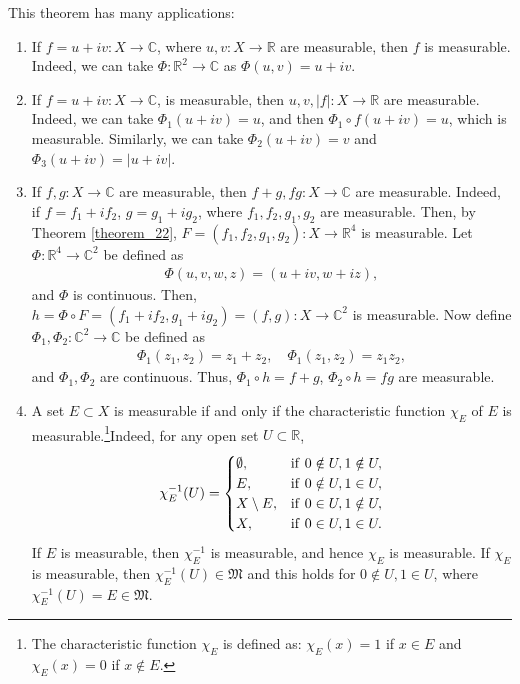 \documentclass[11pt]{book}
\theoremstyle{definition}
\numberwithin{equation}{chapter}
\begin{document}
\medskip

This theorem has many applications:
\begin{enumerate}[label=(\alph*)]
    \item If $f = u + iv: X \to \mathbb{C}$, where $u,v:X\to\mathbb{R}$ are measurable, then $f$ is measurable. Indeed, we can take $\Phi:\mathbb{R}^2 \to \mathbb{C}$ as $\Phi(u,v) = u + iv$.
    
    \item If $f = u + iv: X \to \mathbb{C}$, is measurable, then $u,v,\left|f\right|: X \to \mathbb{R}$ are measurable. Indeed, we can take $\Phi_1(u+iv) = u$, and then $\Phi_1\circ f(u+iv) = u$, which is measurable. Similarly, we can take $\Phi_2(u+iv) = v$ and $\Phi_3(u+iv) = \left|u+iv\right|$.
    
    \item If $f,g: X \to \mathbb{C}$ are measurable, then $f+g,fg: X \to \mathbb{C}$ are measurable. Indeed, if $f = f_1 + if_2$, $g = g_1 + ig_2$, where $f_1,f_2,g_1,g_2$ are measurable. Then, by Theorem \ref{theorem_22}, $F = (f_1,f_2,g_1,g_2): X \to \mathbb{R}^4$ is measurable. Let $\Phi:\mathbb{R}^4 \to \mathbb{C}^2$ be defined as
    \begin{align*}
        \Phi(u,v,w,z) = (u+iv,w+iz),
    \end{align*}
    and $\Phi$ is continuous. Then, $h = \Phi\circ F = (f_1+if_2,g_1+ig_2) = (f,g): X \to \mathbb{C}^2$ is measurable. Now define $\Phi_1, \Phi_2: \mathbb{C}^2 \to \mathbb{C}$ be defined as
    \begin{align*}
        \Phi_1(z_1,z_2) = z_1 + z_2, \quad \Phi_1(z_1,z_2) = z_1 z_2,
    \end{align*}
    and $\Phi_1, \Phi_2$ are continuous. Thus, $\Phi_1\circ h = f+g$, $\Phi_2 \circ h = fg$ are measurable.
    
    \item A set $E \subset X$ is measurable if and only if the characteristic function $\chi_E$ of $E$ is measurable.\footnote{The characteristic function $\chi_E$ is defined as: $\chi_E(x) = 1$ if $x \in E$ and $\chi_E(x) = 0$ if $x \notin E$.}Indeed, for any open set $U \subset \mathbb{R}$,
    \begin{align*}
        \chi_E^{-1}(U) = \begin{cases}
            \emptyset, & {\rm if}\,\, 0 \notin U, 1 \notin U, \\
            E, & {\rm if}\,\, 0 \notin U, 1 \in U, \\
            X \setminus E, & {\rm if}\,\, 0 \in U, 1 \notin U,\\
            X, & {\rm if}\,\, 0 \in U, 1 \in U.
        \end{cases}
    \end{align*}
    If $E$ is measurable, then $\chi_E^{-1}$ is measurable, and hence $\chi_E$ is measurable. If $\chi_E$ is measurable, then $\chi_E^{-1}(U) \in \mathfrak{M}$ and this holds for $0 \notin U, 1 \in U$, where $\chi_E^{-1}(U) = E \in \mathfrak{M}$.
    

\end{enumerate}
\end{document}
